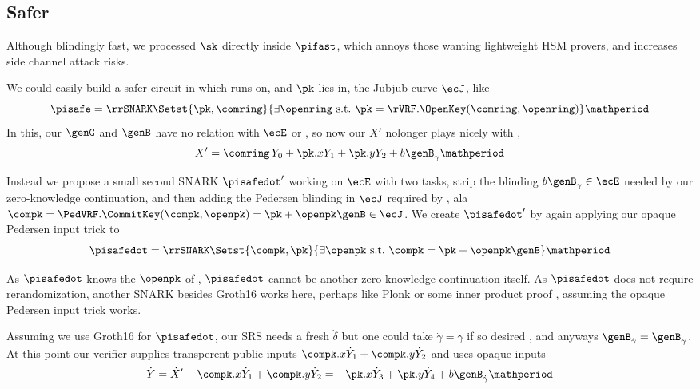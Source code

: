 
\subsection{Safer}

\newcommand\pijub{\ensuremath{\pi_{\mathtt{jub}}}\xspace}
\newcommand\pijubdot{\ensuremath{\dot{\pi}_{\mathtt{jub}}}\xspace}


Although blindingly fast, we processed $\sk$ directly inside $\pifast$,
which annoys those wanting lightweight HSM provers, and
increases side channel attack risks.

We could easily build a safer circuit in which
\PedVRF runs on, and $\pk$ lies in, the Jubjub curve $\ecJ$, like 
$$ \pisafe = \rrSNARK \Setst{ \pk, \comring }{
 \exists \openring \textrm{\ s.t.\ }
 \pk = \rVRF.\OpenKey(\comring,\openring)
} \mathperiod $$
In this, our $\genG$ and $\genB$ have no relation with $\ecE$
or \pisafe, so now our $X'$ nolonger plays nicely with \PedVRF, 
$$ X' = \comring\, Y_0 + \pk.x Y_1 + \pk.y Y_2 + b \genB_\gamma \mathperiod $$

Instead we propose a small second SNARK $\pisafedot'$ working on $\ecE$
with two tasks, strip the blinding $b \genB_\gamma \in \ecE$ needed
by our zero-knowledge continuation, and then adding the Pedersen blinding
in $\ecJ$ required by \PedVRF, ala
 $\compk = \PedVRF.\CommitKey(\compk,\openpk) = \pk + \openpk \genB \in \ecJ$.
We create $\pisafedot'$ by again applying our opaque Pedersen input trick to
$$ \pisafedot = \rrSNARK \Setst{ \compk, \pk }{
 \exists \openpk \textrm{\ s.t.\ } \compk = \pk + \openpk \genB
} \mathperiod $$

As $\pisafedot$ knows the $\openpk$ of \PedVRF,
$\pisafedot$ cannot be another zero-knowledge continuation itself.
As $\pisafedot$ does not require rerandomization, another SNARK besides
Groth16 \cite{Groth16} works here, perhaps like Plonk \cite{plonk} or
some inner product proof \cite{bootle,bulletproofs},
 assuming the opaque Pedersen input trick works.

Assuming we use Groth16 \cite{Groth16} for $\pisafedot$,
our SRS needs a fresh $\dot{\delta}$ but one could take
$\dot{\gamma} = \gamma$ if so desired \cite{???}, and anyways
$\genB_{\dot{\gamma}} = \genB_{\gamma}$.
At this point our verifier supplies transperent public inputs
 $\compk.x \dot{Y}_1 + \compk.y \dot{Y}_2$ and uses opaque inputs
$$ \dot{Y} = \dot{X}' - \compk.x \dot{Y}_1 + \compk.y \dot{Y}_2 =
- \pk.x \dot{Y}_3 + \pk.y \dot{Y}_4 + b \genB_{\dot{\gamma}} \mathperiod $$


